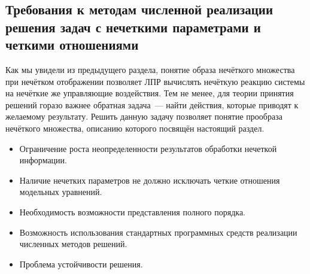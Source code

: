 \subsection{Требования к методам численной реализации решения задач с нечеткими параметрами и четкими отношениями}


Как мы увидели из предыдущего раздела, понятие образа нечёткого множества при нечётком отображении позволяет ЛПР вычислять нечёткую реакцию системы на нечёткие же управляющие воздействия. Тем не менее, для теории принятия решений горазо важнее обратная задача~--- найти действия, которые приводят к желаемому результату. Решить данную задачу позволяет понятие прообраза нечёткого множества, описанию которого посвящён настоящий раздел.

\begin{itemize}
	\item Ограничение роста неопределенности результатов обработки нечеткой информации.
	\item Наличие нечетких параметров не должно исключать четкие отношения модельных уравнений.
	\item Необходимость возможности представления полного порядка.
	\item Возможность использования стандартных программных средств реализации численных методов решений.
	\item Проблема устойчивости решения.
\end{itemize}